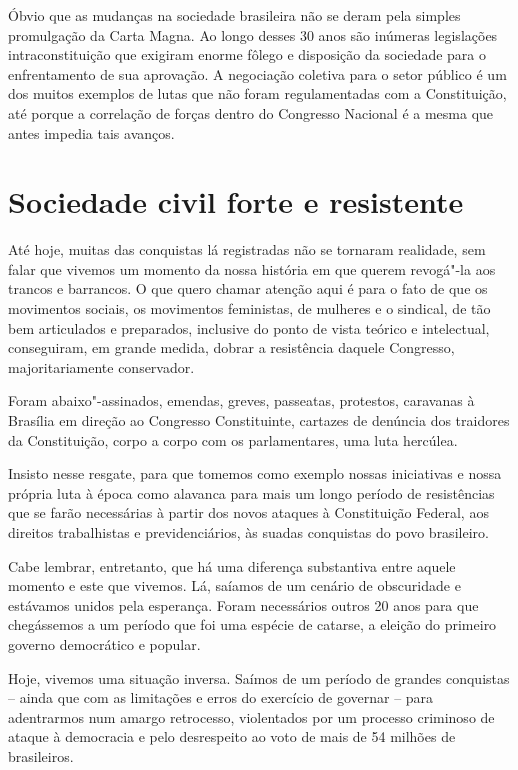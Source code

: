 Óbvio que as mudanças na sociedade brasileira não se deram pela simples
promulgação da Carta Magna. Ao longo desses 30 anos são inúmeras
legislações intraconstituição que exigiram enorme fôlego e disposição
da sociedade para o enfrentamento de sua aprovação. A negociação
coletiva para o setor público é um dos muitos exemplos de lutas que não
foram regulamentadas com a Constituição, até porque a correlação de
forças dentro do Congresso Nacional é a mesma que antes impedia tais
avanços.

\section{Sociedade civil forte e resistente}

Até hoje, muitas das conquistas lá registradas não se tornaram
realidade, sem falar que vivemos um momento da nossa história em que
querem revogá"-la aos trancos e barrancos. O que quero chamar
atenção aqui é para o fato de que os movimentos sociais, os movimentos
feministas, de mulheres e o sindical, de tão bem
articulados e preparados, inclusive do ponto de vista teórico e
intelectual, conseguiram, em grande medida, dobrar a resistência daquele
Congresso, majoritariamente conservador.

Foram abaixo"-assinados, emendas, greves, passeatas, protestos, caravanas
à Brasília em direção ao Congresso Constituinte, cartazes de denúncia dos traidores
da Constituição, corpo a corpo com os parlamentares, uma luta hercúlea.

Insisto nesse resgate, para que tomemos como exemplo nossas iniciativas
e nossa própria luta à época como alavanca para mais um longo período de
resistências que se farão necessárias à partir dos novos ataques à
Constituição Federal, aos direitos trabalhistas e previdenciários, às
suadas conquistas do povo brasileiro.

Cabe lembrar, entretanto, que há uma diferença substantiva entre aquele
momento e este que vivemos. Lá, saíamos de um cenário de obscuridade e
estávamos unidos pela esperança. Foram necessários outros 20 anos para
que chegássemos a um período que foi uma espécie de catarse, a eleição
do primeiro governo democrático e popular.

Hoje, vivemos uma situação inversa. Saímos de um período de grandes
conquistas -- ainda que com as limitações e erros do exercício de
governar -- para adentrarmos num amargo retrocesso, violentados por um
processo criminoso de ataque à democracia e pelo desrespeito ao voto de
mais de 54 milhões de brasileiros.

